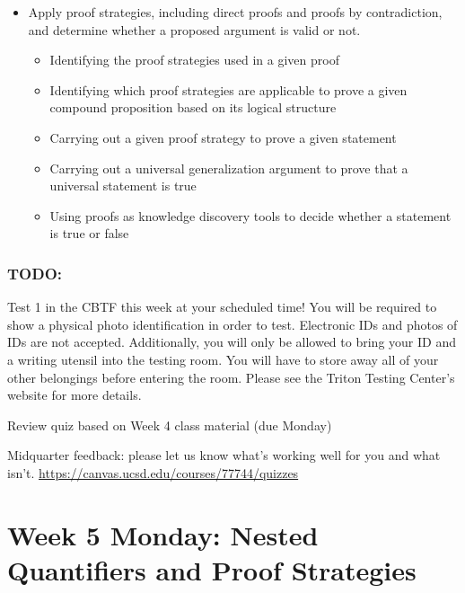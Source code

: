 \begin{itemize}
\item Apply proof strategies, including direct proofs and proofs by contradiction, and determine whether a proposed argument is valid or not.
\begin{itemize}
    \item Identifying the proof strategies used in a given proof
    \item Identifying which proof strategies are applicable to prove a given compound proposition based on its logical structure
    \item Carrying out a given proof strategy to prove a given statement
    \item Carrying out a universal generalization argument to prove that a universal statement is true
    \item Using proofs as knowledge discovery tools to decide whether a statement is true or false
\end{itemize}
\end{itemize}

\subsubsection*{TODO:}
\begin{list}{\itemsep2pt}
    \item Test 1 in the CBTF this week at your scheduled time!
You will be required to show a physical photo identification in order
to test. Electronic IDs and photos of IDs are not accepted. Additionally, you will only be allowed
to bring your ID and a writing utensil into the testing room. You will have to store away all of
your other belongings before entering the room. Please see the Triton Testing Center's website
for more details.
    \item Review quiz based on Week 4 class material (due Monday)
    \item Midquarter feedback: please let us know what's working well for you and what isn't.  \url{https://canvas.ucsd.edu/courses/77744/quizzes}
\end{list}
\newpage

\section*{Week 5 Monday: Nested Quantifiers and Proof Strategies}



\vfill

\newpage
